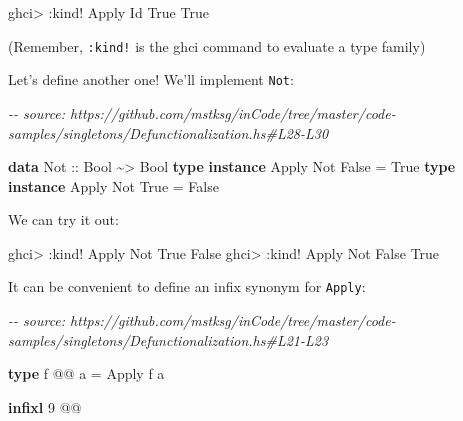 \documentclass[]{article}
\newenvironment{Shaded}{}{}
\newcommand{\CommentTok}[1]{\textcolor[rgb]{0.38,0.63,0.69}{\textit{#1}}}
\newcommand{\DataTypeTok}[1]{\textcolor[rgb]{0.56,0.13,0.00}{#1}}
\newcommand{\DecValTok}[1]{\textcolor[rgb]{0.25,0.63,0.44}{#1}}
\newcommand{\KeywordTok}[1]{\textcolor[rgb]{0.00,0.44,0.13}{\textbf{#1}}}
\newcommand{\NormalTok}[1]{#1}
\newcommand{\OperatorTok}[1]{\textcolor[rgb]{0.40,0.40,0.40}{#1}}
\newcommand{\OtherTok}[1]{\textcolor[rgb]{0.00,0.44,0.13}{#1}}
\begin{document}
\begin{Shaded}
\begin{Highlighting}[]
\NormalTok{ghci}\OperatorTok{>} \OperatorTok{:}\NormalTok{kind}\OperatorTok{!} \DataTypeTok{Apply} \DataTypeTok{Id} \DataTypeTok{\textquotesingle{}True}
\DataTypeTok{\textquotesingle{}True}
\end{Highlighting}
\end{Shaded}

(Remember, \texttt{:kind!} is the ghci command to evaluate a type family)

Let's define another one! We'll implement \texttt{Not}:

\begin{Shaded}
\begin{Highlighting}[]
\CommentTok{{-}{-} source: https://github.com/mstksg/inCode/tree/master/code{-}samples/singletons/Defunctionalization.hs\#L28{-}L30}

\KeywordTok{data} \DataTypeTok{Not}\OtherTok{ ::} \DataTypeTok{Bool} \OperatorTok{\textasciitilde{}>} \DataTypeTok{Bool}
\KeywordTok{type} \KeywordTok{instance} \DataTypeTok{Apply} \DataTypeTok{Not} \DataTypeTok{\textquotesingle{}False} \OtherTok{=} \DataTypeTok{\textquotesingle{}True}
\KeywordTok{type} \KeywordTok{instance} \DataTypeTok{Apply} \DataTypeTok{Not} \DataTypeTok{\textquotesingle{}True}  \OtherTok{=} \DataTypeTok{\textquotesingle{}False}
\end{Highlighting}
\end{Shaded}

We can try it out:

\begin{Shaded}
\begin{Highlighting}[]
\NormalTok{ghci}\OperatorTok{>} \OperatorTok{:}\NormalTok{kind}\OperatorTok{!} \DataTypeTok{Apply} \DataTypeTok{Not} \DataTypeTok{\textquotesingle{}True}
\DataTypeTok{\textquotesingle{}False}
\NormalTok{ghci}\OperatorTok{>} \OperatorTok{:}\NormalTok{kind}\OperatorTok{!} \DataTypeTok{Apply} \DataTypeTok{Not} \DataTypeTok{\textquotesingle{}False}
\DataTypeTok{\textquotesingle{}True}
\end{Highlighting}
\end{Shaded}

It can be convenient to define an infix synonym for \texttt{Apply}:

\begin{Shaded}
\begin{Highlighting}[]
\CommentTok{{-}{-} source: https://github.com/mstksg/inCode/tree/master/code{-}samples/singletons/Defunctionalization.hs\#L21{-}L23}

\KeywordTok{type}\NormalTok{ f }\OperatorTok{@@}\NormalTok{ a }\OtherTok{=} \DataTypeTok{Apply}\NormalTok{ f a}

\KeywordTok{infixl} \DecValTok{9} \OperatorTok{@@}
\end{Highlighting}
\end{Shaded}
\end{document}
